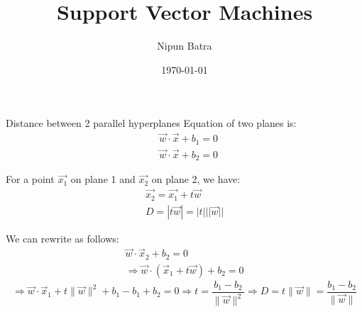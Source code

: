 \documentclass{beamer}
\title{Support Vector Machines}
\date{\today}
\author{Nipun Batra}
\institute{IIT Gandhinagar}
\begin{document}
\maketitle


{
	
}





\begin{frame}{Distance between 2 parallel hyperplanes}
Equation of two planes is:
$$
\begin{aligned}
&\vec{w}\cdot \vec{x}+b_1=0\\
&\vec{w}\cdot \vec{x}+b_2=0
\end{aligned}
$$

\pause For a point $\vec{x_1}$ on plane 1 and $\vec{x_2}$ on plane 2, we have:
\pause $$
\begin{array}{l}
{\overrightarrow{x_{2}}=\overrightarrow{x_{1}}+t \vec{w}} \\
{D=|t \vec{w}|=|t|||\vec{w}| |}
\end{array}
$$

\pause We can rewrite as follows:
\pause $$
\begin{array}{c}
{\vec{w} \cdot \vec{x}_{2}+b_{2}=0} \\
{\Rightarrow \vec{w} \cdot\left(\vec{x}_{1}+t \vec{w}\right)+b_{2}=0}
\end{array}
$$
\pause $$
\Rightarrow \vec{w} \cdot \vec{x}_{1}+t\|\vec{w}\|^{2}+b_1-b_1+b_2 = 0
\Rightarrow t = \frac{b_1 - b_2}{\|\vec{w}\|^{2}}  \Rightarrow D = t\|\vec{w}\| =  \frac{b_1 - b_2}{\|\vec{w}\|}
$$
\end{frame}

{
	
}
\end{document}
